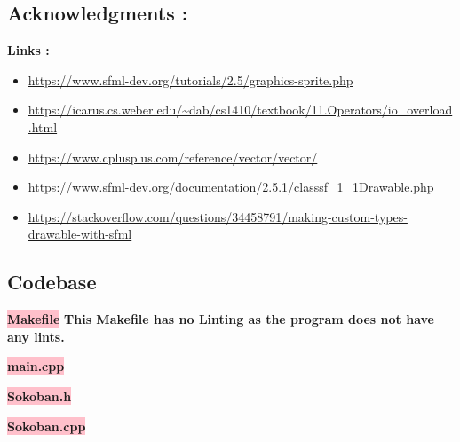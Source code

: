 \subsection{Acknowledgments :}\label{sec:ps3a:ack}
\textbf{Links :}
\begin{itemize}
    \item \url{https://www.sfml-dev.org/tutorials/2.5/graphics-sprite.php}
    \item \url{https://icarus.cs.weber.edu/~dab/cs1410/textbook/11.Operators/io_overload.html}
    \item \url{https://www.cplusplus.com/reference/vector/vector/}
    \item \url{https://www.sfml-dev.org/documentation/2.5.1/classsf_1_1Drawable.php}
    \item \url{https://stackoverflow.com/questions/34458791/making-custom-types-drawable-with-sfml}
\end{itemize}


\subsection{Codebase}\label{sec:ps2a:code}

\textbf{\colorbox{pink}{Makefile}} \newline \textbf{This Makefile has no Linting as the program does not have any lints.}


\textbf{\colorbox{pink}{main.cpp}} \newline 


\textbf{\colorbox{pink}{Sokoban.h}} \newline \


\newpage
\textbf{\colorbox{pink}{Sokoban.cpp}} \newline 


\newpage
